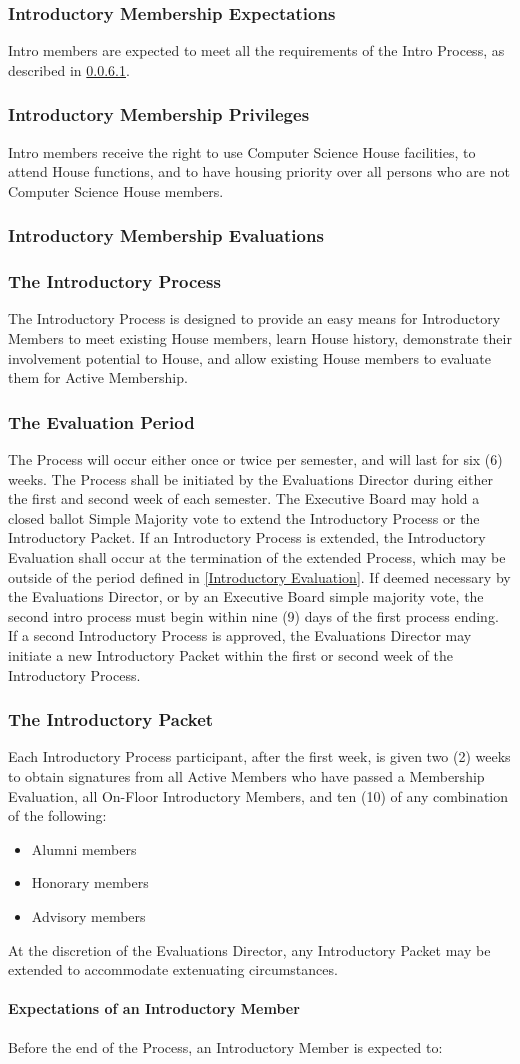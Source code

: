 \documentclass{article}
\newcommand{\asubsection}[1]{\subsubsection{#1} \label{#1}}
\newcommand{\asubsubsection}[1]{\paragraph{#1} \label{#1}}
\begin{document}
\asubsection{Introductory Membership Expectations}
Intro members are expected to meet all the requirements of the Intro Process, as described in \ref{Expectations of an Introductory Member}.

\asubsection{Introductory Membership Privileges}
Intro members receive the right to use Computer Science House facilities, to attend House functions, and to have housing priority over all persons who are not Computer Science House members.

\asubsection{Introductory Membership Evaluations}
\asubsection{The Introductory Process}
The Introductory Process is designed to provide an easy means for Introductory Members to meet existing House members, learn House history, demonstrate their involvement potential to House, and allow existing House members to evaluate them for Active Membership.
\asubsection{The Evaluation Period}
The Process will occur either once or twice per semester, and will last for six (6) weeks.
The Process shall be initiated by the Evaluations Director during either the first and second week of each semester.
The Executive Board may hold a closed ballot Simple Majority vote to extend the Introductory Process or the Introductory Packet.
If an Introductory Process is extended, the Introductory Evaluation shall occur at the termination of the extended Process, which may be outside of the period defined in \ref{Introductory Evaluation}.
If deemed necessary by the Evaluations Director, or by an Executive Board simple majority vote, the second intro process must begin within nine (9) days of the first process ending.
If a second Introductory Process is approved, the Evaluations Director may initiate a new Introductory Packet within the first or second week of the Introductory Process.
\asubsection{The Introductory Packet}
Each Introductory Process participant, after the first week, is given two (2) weeks to obtain signatures from all Active Members who have passed a Membership Evaluation, all On-Floor Introductory Members, and ten (10) of any combination of the following:
\begin{itemize}
	\item Alumni members
	\item Honorary members
	\item Advisory members
\end{itemize}
At the discretion of the Evaluations Director, any Introductory Packet may be extended to accommodate extenuating circumstances.
\asubsubsection{Expectations of an Introductory Member}
Before the end of the Process, an Introductory Member is expected to:
\end{document}
